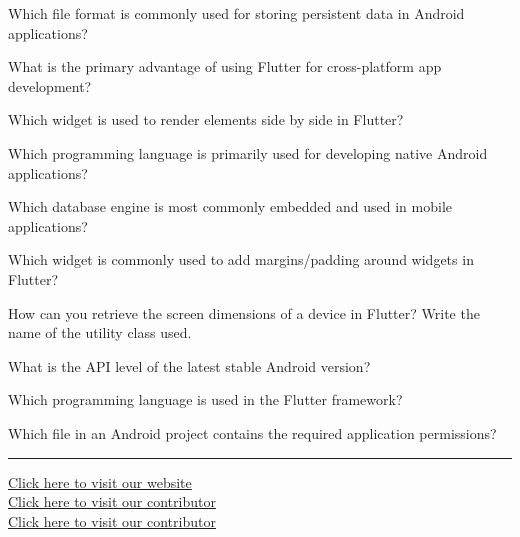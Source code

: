 \documentclass[11pt,a4paper]{article}
\begin{document}
\begin{parts}
  \item Which file format is commonly used for storing persistent data in Android applications?
  \item What is the primary advantage of using Flutter for cross-platform app development?
  \item Which widget is used to render elements side by side in Flutter?
  \item Which programming language is primarily used for developing native Android applications?
  \item Which database engine is most commonly embedded and used in mobile applications?
  \item Which widget is commonly used to add margins/padding around widgets in Flutter?
  \item How can you retrieve the screen dimensions of a device in Flutter? Write the name of the utility class used.
  \item What is the API level of the latest stable Android version?
  \item Which programming language is used in the Flutter framework?
  \item Which file in an Android project contains the required application permissions?
\end{parts}

\vfill
\rule{\linewidth}{0.4pt}

\begin{center}\small
\href{https://bhu-exam.vercel.app/}{Click here to visit our website}\\[4pt]\href{https://me-aryan.vercel.app/}{Click here to visit our contributor}\\[4pt]\href{https://quashan-me.vercel.app/}{Click here to visit our contributor}
\end{center}
\end{document}
